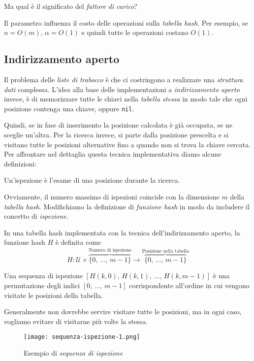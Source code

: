 \bigskip\noindent
Ma qual è il significato del \emph{fattore di carico}?

Il parametro influenza il costo delle operazioni sulla \emph{tabella hash}.
Per esempio, se $n=O(m)$, $\alpha=O(1)$ e quindi tutte le operazioni costano $O(1)$.

\subsection{Indirizzamento aperto}
Il problema delle \emph{liste di trabocco} è che ci costringono a
realizzare una \emph{struttura dati} complessa. L'idea alla base delle
implementazioni a \emph{indirizzamento aperto} invece, è di memorizzare tutte le
chiavi nella \emph{tabella stessa} in modo tale che ogni posizione contenga
una chiave, oppure \texttt{nil}.

Quindi, se in fase di inserimento la posizione calcolata è già
occupata, se ne sceglie un'altra. Per la ricerca invece, si parte dalla posizione
prescelta e si visitano tutte le posizioni alternative fino a quando non si
trova la chiave cercata. Per affrontare nel dettaglia questa tecnica implementativa
diamo alcune definizioni:
\begin{definition}[Ispezione]
    Un'ispezione è l'esame di una posizione durante la ricerca.
\end{definition}\noindent
Ovviamente, il numero massimo di ispezioni coincide con la dimensione $m$ della
\emph{tabella hash}. Modifichiamo la definizione di \emph{funzione hash} in modo
da includere il concetto di \emph{ispezione}.
\begin{definition}
    In una tabella hash implementata con la tecnica dell'indirizzamento aperto,
    la funzione hash $H$ è definita come
    \[H:\mathcal{U}\times\overbrace{\{0,\,\dots,\,m-1\}}^{\text{Numero di ispezione}}
    \to\overbrace{\{0,\,\dots,\,m-1\}}^{\text{Posizione nella tabella}}\]
\end{definition}
\begin{definition}
    Una sequenza di ispezione $[H(k,0),\,H(k,1),\,\dots,\,H(k,m-1)]$ è una
    permutazione degli indici $[0,\,\dots,\,m-1]$ corrispondente all'ordine
    in cui vengono visitate le posizioni della tabella.
\end{definition}\noindent
Generalmente non dovrebbe servire visitare tutte le posizioni, ma in ogni caso,
vogliamo evitare di visitarne più volte la stessa.

\begin{figure}[ht]
    \centering
    \texttt{[image: sequenza-ispezione-1.png]}
    \caption{Esempio di \emph{sequenza di ispezione}}
\end{figure}

